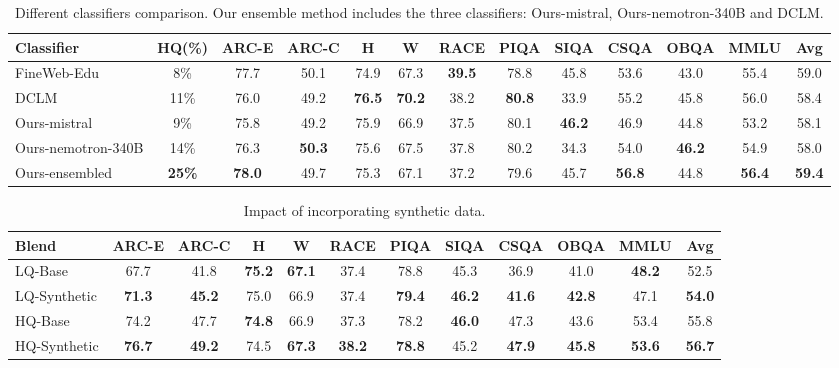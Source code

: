 \documentclass[11pt]{article}
\begin{document}
\addtolength{\tabcolsep}{-3pt}   
\begin{table}[!ht]
\centering
\small
\begin{tabularx}{\textwidth}{Xcccccccccccc}
\toprule
\textbf{Classifier} & \textbf{HQ(\%)} & \textbf{ARC-E} & \textbf{ARC-C} & \textbf{H} & \textbf{W} & \textbf{RACE} & \textbf{PIQA} & \textbf{SIQA} & \textbf{CSQA} & \textbf{OBQA} & \textbf{MMLU} & \textbf{Avg} \\ \midrule
FineWeb-Edu & 8\% & 77.7 & 50.1 & 74.9 & 67.3 & \textbf{39.5} & 78.8 & 45.8 & 53.6 & 43.0 & 55.4 & 59.0 \\
DCLM & 11\% & 76.0 & 49.2 & \textbf{76.5} & \textbf{70.2} & 38.2 & \textbf{80.8} & 33.9 & 55.2 & 45.8 & 56.0 & 58.4 \\
Ours-mistral & 9\% & 75.8 & 49.2 & 75.9 & 66.9 & 37.5 & 80.1 & \textbf{46.2} & 46.9 & 44.8 & 53.2 & 58.1 \\
Ours-nemotron-340B & 14\% & 76.3 & \textbf{50.3} & 75.6 & 67.5 & 37.8 & 80.2 & 34.3 & 54.0 & \textbf{46.2} & 54.9 & 58.0 \\
Ours-ensembled & \textbf{25\%} & \textbf{78.0} & 49.7 & 75.3 & 67.1 & 37.2 & 79.6 & 45.7 & \textbf{56.8} & 44.8 & \textbf{56.4} & \textbf{59.4} \\ \bottomrule
\end{tabularx}
\caption{Different classifiers comparison. Our ensemble method includes the three classifiers: Ours-mistral, Ours-nemotron-340B and DCLM.}
\label{table:classifier_ablation}
\end{table}
\addtolength{\tabcolsep}{3pt}

\begin{table}[!hbt]
\small
\centering
\begin{tabularx}{\textwidth}{Xccccccccccc}
\toprule
\textbf{Blend}              & \textbf{ARC-E}         & \textbf{ARC-C}         & \textbf{H}     & \textbf{W}    & \textbf{RACE}          & \textbf{PIQA}          & \textbf{SIQA}    & \textbf{CSQA} & \textbf{OBQA}    & \textbf{MMLU}          & \textbf{Avg}       \\

\midrule
LQ-Base & 67.7 & 41.8 & \textbf{75.2} & \textbf{67.1} & 37.4 & 78.8 & 45.3 & 36.9 & 41.0 & \textbf{48.2} & 52.5 \\
LQ-Synthetic & \textbf{71.3} & \textbf{45.2} & 75.0 & 66.9 & 37.4 & \textbf{79.4} & \textbf{46.2} & \textbf{41.6} & \textbf{42.8} & 47.1 & \textbf{54.0} \\
\midrule
HQ-Base  & 74.2 & 47.7 & \textbf{74.8} & 66.9 & 37.3 & 78.2 & \textbf{46.0} & 47.3 & 43.6 & 53.4 & 55.8 \\
HQ-Synthetic  & \textbf{76.7} & \textbf{49.2} & 74.5 & \textbf{67.3} & \textbf{38.2} & \textbf{78.8} & 45.2 & \textbf{47.9} & \textbf{45.8} & \textbf{53.6} & \textbf{56.7} \\
\bottomrule
\end{tabularx}
\caption{Impact of incorporating synthetic data.}
\label{table:synthetic_data_ablation}
\end{table}
\end{document}
